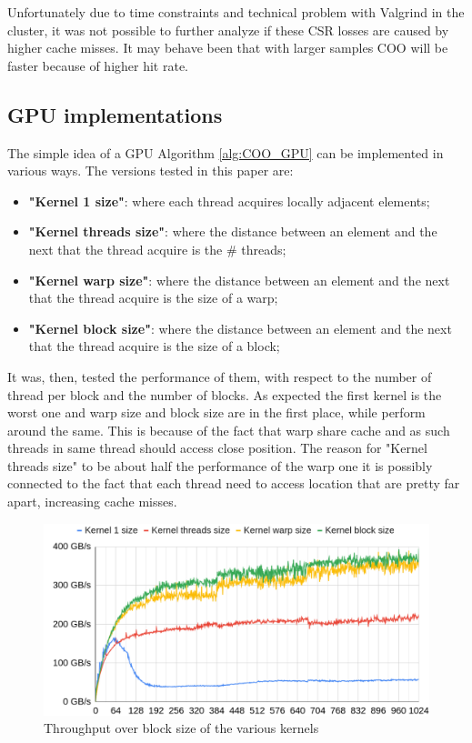 \documentclass[conference]{IEEEtran}
\begin{document}
\FloatBarrier
Unfortunately due to time constraints and technical problem with Valgrind in the cluster, it was not possible to further analyze if these CSR losses are caused by higher cache misses. It may behave been that with larger samples COO will be faster because of higher hit rate.

\subsection{GPU implementations}
The simple idea of a GPU Algorithm \ref{alg:COO_GPU} can be implemented in various ways. The versions tested in this paper are:
\begin{itemize}
	\item \textbf{"Kernel 1 size"}: where each thread acquires locally adjacent elements;
	\item \textbf{"Kernel threads size"}: where the distance between an element and the next that the thread acquire is the \# threads;
	\item \textbf{"Kernel warp size"}: where the distance between an element and the next that the thread acquire is the size of a warp;
	\item \textbf{"Kernel block size"}: where the distance between an element and the next that the thread acquire is the size of a block;
\end{itemize}

It was, then, tested the performance of them, with respect to the number of thread per block and the number of blocks. As expected the first kernel is the worst one and warp size and block size are in the first place, while perform around the same. This is because of the fact that warp share cache and as such threads in same thread should access close position. The reason for "Kernel threads size" to be about half the performance of the warp one it is possibly connected to the fact that each thread need to access location that are pretty far apart, increasing cache misses.

\begin{figure}[hbt!]
	\centering
	\includegraphics[width=1\linewidth]{data_images/Gb_for_size_block}
	\caption{Throughput over block size of the various kernels }
	\label{fig:gbforsizeblock}
\end{figure}
\end{document}
